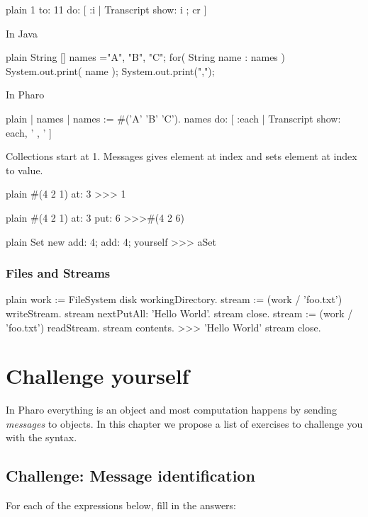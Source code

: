 \documentclass[10pt,twoside,english]{_support/latex/sbabook/sbabook}
\begin{document}
\begin{displaycode}{plain}
1 to: 11 do: [ :i | Transcript show: i ; cr ] 
\end{displaycode}

In Java

\begin{displaycode}{plain}
String [] names ={"A", "B", "C"};
for( String name : names ) { 
     System.out.print( name );  
     System.out.print(","); }  
\end{displaycode}

In Pharo

\begin{displaycode}{plain}
| names | 
names := #('A' 'B' 'C').
names do: [ :each | Transcript show: each, ' , ' ]
\end{displaycode}

Collections start at 1. Messages  gives element at index and  sets element at index to value.

\begin{displaycode}{plain}
#(4 2 1) at: 3
>>> 1 
\end{displaycode}

\begin{displaycode}{plain}
#(4 2 1) at: 3 put: 6
>>>#(4 2 6) 
\end{displaycode}

\begin{displaycode}{plain}
Set new add: 4; add: 4; yourself
>>> aSet 
\end{displaycode}
\subsection{Files and Streams}
\begin{displaycode}{plain}
work := FileSystem disk workingDirectory. 
stream := (work / 'foo.txt') writeStream. 
stream nextPutAll: 'Hello World'. 
stream close. 
stream := (work / 'foo.txt') readStream. 
stream contents. 
>>> 'Hello World' 
stream close.
\end{displaycode}
\chapter{Challenge yourself}\label{cha:challenging}
In Pharo everything is an object and most computation happens by sending  \textit{messages} to objects. In this chapter we propose a list of exercises to challenge you with the syntax.
\section{Challenge: Message identification}
For each of the expressions below, fill in the answers:
\end{document}
